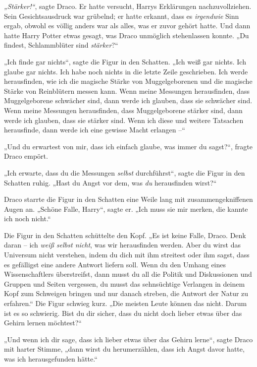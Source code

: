 {\emph{„Stärker!“}, sagte Draco. Er hatte versucht, Harrys Erklärungen nachzuvollziehen. Sein Gesichtsausdruck war grübelnd; er hatte erkannt, dass es \emph{irgendwie} Sinn ergab, obwohl es völlig anders war als alles, was er zuvor gehört hatte. Und dann hatte Harry Potter etwas gesagt, was Draco unmöglich stehenlassen konnte. „Du findest, Schlammblüter sind \emph{stärker}?“

„Ich finde gar nichts“, sagte die Figur in den Schatten. „Ich weiß gar nichts. Ich glaube gar nichts. Ich habe noch nichts in die letzte Zeile geschrieben. Ich werde herausfinden, wie ich die magische Stärke von Muggelgeborenen und die magische Stärke von Reinblütern messen kann. Wenn meine Messungen herausfinden, dass Muggelgeborene schwächer sind, dann werde ich glauben, dass sie schwächer sind. Wenn meine Messungen herausfinden, dass Muggelgeborene stärker sind, dann werde ich glauben, dass sie stärker sind. Wenn ich diese und weitere Tatsachen herausfinde, dann werde ich eine gewisse Macht erlangen --“

„Und du erwartest von mir, dass ich einfach glaube, was immer du sagst?“, fragte Draco empört.

„Ich erwarte, dass du die Messungen \emph{selbst} durchführst“, sagte die Figur in den Schatten ruhig. „Hast du Angst vor dem, was \emph{du} herausfinden wirst?“

Draco starrte die Figur in den Schatten eine Weile lang mit zusammengekniffenen Augen an. „Schöne Falle, Harry“, sagte er. „Ich muss sie mir merken, die kannte ich noch nicht.“

Die Figur in den Schatten schüttelte den Kopf. „Es ist keine Falle, Draco. Denk daran -- ich \emph{weiß selbst nicht}, was wir herausfinden werden. Aber du wirst das Universum nicht verstehen, indem du dich mit ihm streitest oder ihm sagst, dass es gefälligst eine andere Antwort liefern soll. Wenn du den Umhang eines Wissenschaftlers überstreifst, dann musst du all die Politik und Diskussionen und Gruppen und Seiten vergessen, du musst das sehnsüchtige Verlangen in deinem Kopf zum Schweigen bringen und nur danach streben, die Antwort der Natur zu erfahren.“ Die Figur schwieg kurz. „Die meisten Leute können das nicht. Darum ist es so schwierig. Bist du dir sicher, dass du nicht doch lieber etwas über das Gehirn lernen möchtest?“

„Und wenn ich dir sage, dass ich lieber etwas über das Gehirn lerne“, sagte Draco mit harter Stimme, „dann wirst du herumerzählen, dass ich Angst davor hatte, was ich herausgefunden hätte.“

}
